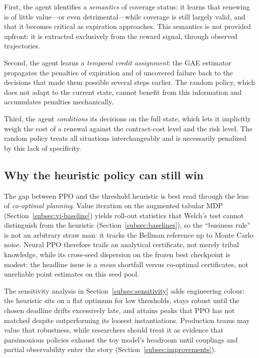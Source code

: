 First, the agent identifies a \emph{semantics} of coverage status: it learns
that renewing is of little value---or even detrimental---while coverage is
still largely valid, and that it becomes critical as expiration approaches.
This semantics is not provided upfront: it is extracted exclusively from the
reward signal, through observed trajectories.

Second, the agent learns a \emph{temporal credit assignment}: the GAE
estimator propagates the penalties of expiration and of uncovered failure
back to the decisions that made them possible several steps earlier. The
random policy, which does not adapt to the current state, cannot benefit
from this information and accumulates penalties mechanically.

Third, the agent \emph{conditions} its decisions on the full state, which
lets it implicitly weigh the cost of a renewal against the contract-cost
level and the risk level. The random policy treats all situations
interchangeably and is necessarily penalized by this lack of specificity.


\subsection{Why the heuristic policy can still win}
\label{subsec:why-heuristic-wins}

The gap between PPO and the threshold heuristic is best read through the lens
of \emph{co-optimal planning}. Value iteration on the augmented tabular MDP
(Section~\ref{subsec:vi-baseline}) yields roll-out statistics that Welch's test
cannot distinguish from the heuristic (Section~\ref{subsec:baselines}), so the
``business rule'' is not an arbitrary straw man: it tracks the Bellman reference
up to Monte Carlo noise. Neural PPO therefore trails an analytical certificate,
not merely tribal knowledge, while its cross-seed dispersion on the frozen
best checkpoint is modest: the headline issue is a \emph{mean} shortfall versus
co-optimal certificates, not unreliable point estimates on this seed pool.

The sensitivity analysis in Section~\ref{subsec:sensitivity} adds engineering colour:
the heuristic sits on a flat optimum for low thresholds, stays robust until the
chosen deadline drifts excessively late, and attains peaks that PPO has not
matched despite outperforming its loosest instantiations. Production teams may value that robustness,
while researchers should treat it as evidence that parsimonious policies exhaust
the toy model's headroom until couplings and partial observability enter the story
(Section~\ref{subsec:improvements}).


